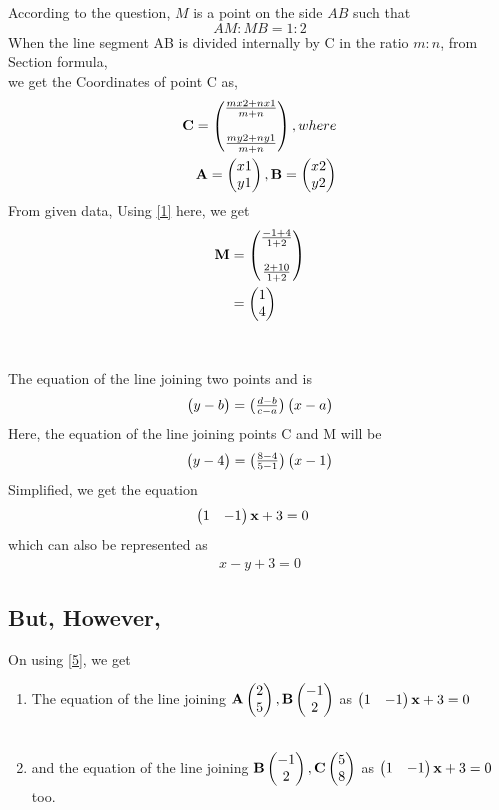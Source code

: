 \documentclass[journal,12pt,twocolumn]{IEEEtran}
\begin{document}
\solution According to the question, $M$ is a point on the side $AB$ such that $$AM : MB = 1 : 2$$
 When the line segment AB is divided internally by C in the ratio $m:n$, from Section formula,\\
 we get the Coordinates of point C as,
\begin{align} \label{1}
\mathbf{C} = \begin{pmatrix}\frac{mx2+nx1}{m+n}\\\\ \frac{my2+ny1}{m+n}\end{pmatrix}, where\\
     \mathbf{A}=\begin{pmatrix}x1\\y1\end{pmatrix}, \mathbf{B}=\begin{pmatrix}x2\\y2\end{pmatrix} \label{2}
\end{align}
From given data, Using \eqref{1} here, we get
\begin{align}
    \mathbf{M} &= \begin{pmatrix}\frac{-1+4}{1+2}\\\\ \frac{2+10}{1+2}\end{pmatrix}\\  \label{3}
   &= \begin{pmatrix}1\\4\end{pmatrix}
\end{align}\\\\ 
The equation of the line joining two points  and  is 
\begin{align}
    \begin{pmatrix}y-b\end{pmatrix} = {\begin{pmatrix}\frac{d-b}{c-a}\end{pmatrix}}\begin{pmatrix}x-a\end{pmatrix} \label{5}
\end{align}
Here, the equation of the line joining points C and M will be
\begin{align}
    \begin{pmatrix}y-4\end{pmatrix} = \begin{pmatrix}\frac{8-4}{5-1}\end{pmatrix}\begin{pmatrix}x-1\end{pmatrix} \label{6}
\end{align}
Simplified, we get the equation
\begin{align}
    \begin{pmatrix}1 & - 1\end{pmatrix}\mathbf{x} + 3 &=0 
\end{align}
 which can also be represented as 
 \begin{align}
     x-y+3=0
 \end{align}
\subsection*{But, However,} On using \eqref{5}, we get\\
\begin{enumerate}
    \item The equation of the line joining $\mathbf{A}\begin{pmatrix}2\\5\end{pmatrix}, \mathbf{B}\begin{pmatrix}-1\\2\end{pmatrix}$ as $\begin{pmatrix}1 & - 1\end{pmatrix}\mathbf{x} + 3 = 0$ \\\\
    
    \item and the equation of the line joining $\mathbf{B}\begin{pmatrix}-1\\2\end{pmatrix}, \mathbf{C}\begin{pmatrix}5\\8\end{pmatrix}$ as $\begin{pmatrix}1 & - 1\end{pmatrix}\mathbf{x} + 3 = 0$ too.\\
\end{enumerate}
\end{document}
